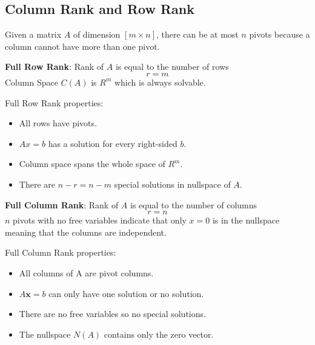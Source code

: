 \documentclass[10pt,a4paper]{article}
\begin{document}
\subsection{Column Rank and Row Rank}

Given a matrix $A$ of dimension $[m\times n]$, there can be at most $n$ pivots because a column cannot have more than one pivot.

\begin{tcolorbox}[breakable,colback=white]
    \textbf{Full Row Rank}: Rank of $A$ is equal to the number of rows 
    $$
    r=m
    $$
    Column Space $C(A)$ is $R^m$ which is always solvable. 
\end{tcolorbox}

Full Row Rank properties:
\begin{itemize}
    \item All rows have pivots.
    \item $Ax=b$ has a solution for every right-sided $b$.
    \item Column space spans the whole space of $R^m$.
    \item There are $n-r=n-m$ special solutions in nullspace of $A$.
\end{itemize}

\begin{tcolorbox}[breakable,colback=white]
    \textbf{Full Column Rank}: Rank of $A$ is equal to the number of columns 
    $$
    r=n
    $$
    $n$ pivots with no free variables indicate that only $x=0$ is in the nullspace meaning that the
    columns are independent.
\end{tcolorbox}

Full Column Rank properties:
\begin{itemize}
    \item All columns of A are pivot columns.
    \item $A\textbf{x}=b$ can only have one solution or no solution.
    \item There are no free variables so no special solutions.
    \item The nullspace $N(A)$ contains only the zero vector.
\end{itemize}
\end{document}
